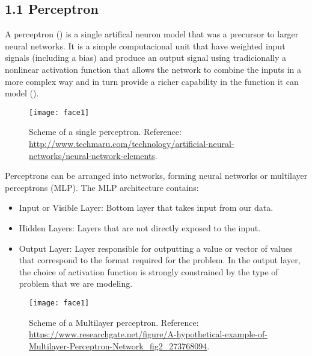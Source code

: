 \documentclass[12pt,a4paper,authoryear]{elsarticle}
\begin{document}
	\subsection*{1.1  Perceptron}
	
		A perceptron (\cite{freund1999large}) is a single artifical neuron model that was a precursor to larger neural networks. It is a simple computacional unit that have weighted input signals (including a bias) and produce an output signal using tradicionally a nonlinear activation function that allows the network to combine the inputs in a more complex way and in turn provide a richer capability in the function it can model (\cite{deeppython}).
	
		\begin{figure}[H]
			\begin{center}
				\texttt{[image: face1]}
				\caption{Scheme of a single perceptron. Reference: \url{http://www.techmaru.com/technology/artificial-neural-networks/neural-network-elements}.}
			\end{center}
		\end{figure}
		
		Perceptrons can be arranged into networks, forming neural networks or multilayer perceptrons (MLP). The MLP architecture contains:
	
		\begin{itemize}
			\item Input or Visible Layer: Bottom layer that takes input from our data.
		
			\item Hidden Layers: Layers that are not directly exposed to the input.
		
			\item Output Layer: Layer responsible for outputting a value or vector of values that correspond to the format required for the problem. In the output layer, the choice of activation function is strongly constrained by the type of problem that we are modeling.		
		\end{itemize}
			
		\begin{figure}[H]
			\begin{center}
				\texttt{[image: face1]}
				\caption{Scheme of a Multilayer perceptron. Reference: \url{https://www.researchgate.net/figure/A-hypothetical-example-of-Multilayer-Perceptron-Network_fig2_273768094}.}
			\end{center}
		\end{figure}
		
\end{document}
